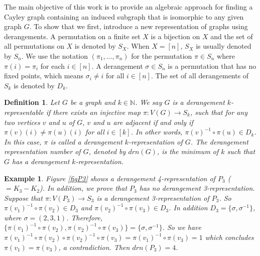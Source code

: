\documentclass[11pt,letterpaper]{article}
\newtheorem{example}[theorem]{Example}
\newtheorem{definition}[theorem]{Definition}
\begin{document}
{The main objective of this work is to provide an algebraic approach for finding a Cayley graph containing an induced subgraph that is isomorphic to any given graph $G$. To show that we first, introduce a new representation of graphs using derangements. A permutation on a finite set $X$ is a bijection on $X$ and the set of all permutations on  $X$ is denoted by $S_X$. When $X=[n]$, $S_X$ is usually denoted by $S_n$. We use the notation $(\pi_1,\ldots,\pi_n)$ for the permutation $\pi\in S_n$ where $\pi(i)=\pi_i$ for each $i\in [n]$. A derangement $\sigma\in S_n$ is a permutation that has no fixed points, which means $\sigma_i\neq i$ for all $i\in [n]$. The set of all derangements of $S_k$ is denoted by $D_k$.\\
\begin{definition}\label{def1}
Let $G$ be a graph and $k\in\mathbb{N}$. We say $G$ is a {\it derangement $k$-representable} if there exists an injective map $\pi:V(G)\rightarrow S_k$, such that for any two vertices $v$ and $u$ of $G$, $v$ and $u$ are adjacent if and only if $\pi(v)(i) \neq \pi(u)(i)$ for all $i \in [k]$. In other words,
$\pi(v)^{-1}\circ \pi(u) \in D_k$. In this case, $\pi$ is called a derangement $k$-representation of $G$. The derangement representation number of $G$, denoted by $drn(G)$, is the minimum of $k$ such that $G$ has a derangement $k$-representation.\\
\end{definition}
\begin{example}\label{example1}
Figure \ref{figP3} shows a derangement 4-representation of $P_3$ ($=K_3-K_2$). In addition, we prove that $P_3$ has no derangement 3-representation. Suppose that $\pi: V(P_3)\rightarrow S_3$ is a derangement 3-representation of $P_3$. So $\pi(v_1)^{-1}\circ \pi(v_2)\in D_3$ and $\pi(v_2)^{-1}\circ \pi(v_3)\in D_3$. In addition $D_3=\{\sigma,\sigma^{-1}\}$, where $\sigma=(2,3,1)$. Therefore, $\{\pi(v_1)^{-1}\circ\pi(v_2), \pi(v_2)^{-1}\circ \pi(v_3)\}=\{\sigma,\sigma^{-1}\}$. So we have $\pi(v_1)^{-1}\circ \pi(v_2)\circ \pi(v_2)^{-1}\circ \pi(v_3)=\pi(v_1)^{-1}\circ \pi(v_3)=1$ which concludes $\pi(v_1)=\pi(v_3)$, a contradiction. Then $drn(P_3)=4$.
\end{example}
}
\end{document}
